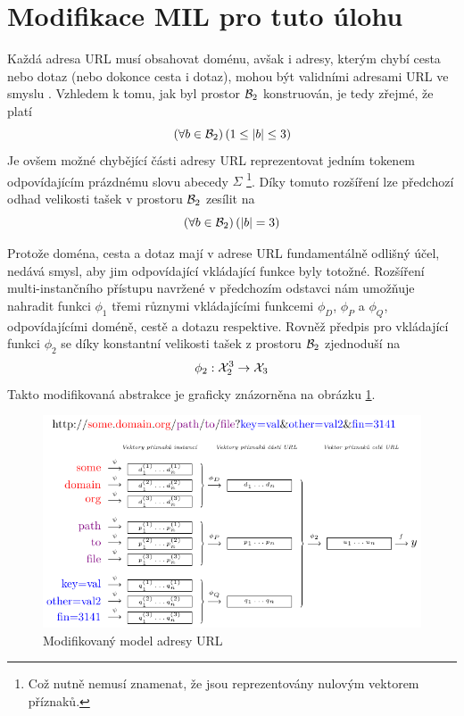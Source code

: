 \section{Modifikace MIL pro tuto úlohu}\label{MIL-modification}
Každá adresa URL musí obsahovat doménu, avšak i adresy, kterým chybí cesta nebo dotaz (nebo dokonce cesta i dotaz), mohou být validními adresami URL ve smyslu \cite{berners-lee_uniform_1994}. Vzhledem k tomu, jak byl prostor \( \mathcal B_2 \) konstruován, je tedy zřejmé, že platí
\[ \left( \forall b \in \mathcal B_2 \right) \left( 1 \leq \left| b \right| \leq 3 \right) \]
Je ovšem možné chybějící části adresy URL reprezentovat jedním tokenem odpovídajícím prázdnému slovu abecedy \( \Sigma \) \footnote{Což nutně nemusí znamenat, že jsou reprezentovány nulovým vektorem příznaků.}. Díky tomuto rozšíření lze předchozí odhad velikosti tašek v prostoru \( \mathcal B_2 \) zesílit na
\[ \left( \forall b \in \mathcal B_2 \right) \left( \left| b \right| = 3 \right) \]

Protože doména, cesta a dotaz mají v adrese URL fundamentálně odlišný účel, nedává smysl, aby jim odpovídající vkládající funkce byly totožné. Rozšíření multi-instančního přístupu navržené v předchozím odstavci nám umožňuje nahradit funkci \( \phi_1 \) třemi různymi vkládajícími funkcemi \( \phi_D \), \( \phi_P \) a \( \phi_Q \), odpovídajícími doméně, cestě a dotazu respektive. Rovněž předpis pro vkládající funkci \( \phi_2 \) se díky konstantní velikosti tašek z prostoru \( \mathcal B_2 \) zjednoduší na
\[ \phi_2 : \mathcal X_2^3 \to \mathcal X_3 \]
Takto modifikovaná abstrakce je graficky znázorněna na obrázku \ref{url_model_modified_MIL}.

\begin{figure}[h]
	\centering
	\includegraphics{images/model_modified_MIL/model_modified_MIL.pdf}
	\caption{Modifikovaný model adresy URL}\label{url_model_modified_MIL}
\end{figure}

